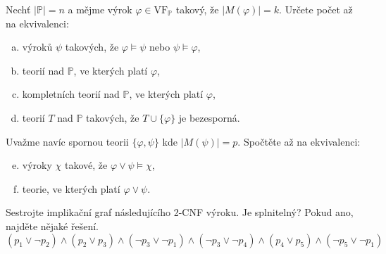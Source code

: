 \begin{problem}

    Nechť $|\mathbb{P}|=n$ a mějme výrok $\varphi\in\mathrm{VF}_{\mathbb{P}}$ takový, že $|M(\varphi)|=k$. Určete počet až na ekvivalenci:
    \begin{enumerate}[(a)]
        \item výroků $\psi$ takových, že $\varphi \models \psi$ nebo $\psi \models \varphi$,
        \item teorií nad $\mathbb{P}$, ve kterých platí $\varphi$,
        \item kompletních teorií nad $\mathbb{P}$, ve kterých platí $\varphi$,
        \item teorií $T$ nad $\mathbb{P}$ takových, že $T \cup \{\varphi\}$ je bezesporná.
    \end{enumerate}
    Uvažme navíc spornou teorii $\{\varphi,\psi\}$ kde $|M(\psi)|=p$. Spočtěte až na ekvivalenci:
    \begin{enumerate}[(a)]\setcounter{enumi}{4}
        \item výroky $\chi$ takové, že $\varphi \vee \psi \models \chi$, 
        \item teorie, ve kterých platí $\varphi \vee \psi$.
    \end{enumerate}

    \begin{solution}
                
    \end{solution}
    
\end{problem}


\begin{problem} \label{problem:2sat}
    
    Sestrojte implikační graf následujícího 2-CNF výroku. Je splnitelný? Pokud ano, najděte nějaké řešení.
    $$
    (p_1\vee \neg p_2)\wedge (p_2\vee p_3)\wedge (\neg p_3\vee \neg p_1)\wedge (\neg p_3\vee \neg p_4)\wedge (p_4\vee p_5)\wedge (\neg p_5\vee \neg p_1)
    $$

    \begin{solution}
                
    \end{solution}


\end{problem}


